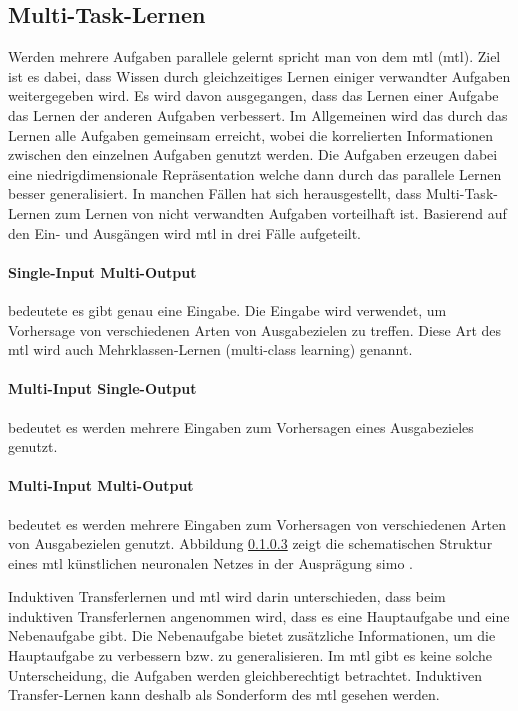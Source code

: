 		\subsection{Multi-Task-Lernen}
		Werden mehrere Aufgaben parallele gelernt spricht man von dem \acl{mtl} (\ac{mtl}). Ziel ist es dabei, dass Wissen durch gleichzeitiges Lernen einiger verwandter Aufgaben weitergegeben wird. Es wird davon ausgegangen, dass das Lernen einer Aufgabe das Lernen der anderen Aufgaben verbessert. Im Allgemeinen wird das durch das Lernen alle Aufgaben gemeinsam erreicht, wobei die korrelierten Informationen zwischen den einzelnen Aufgaben genutzt werden. Die Aufgaben erzeugen dabei eine niedrigdimensionale Repräsentation welche dann durch das parallele Lernen besser generalisiert. In manchen Fällen hat sich herausgestellt, dass Multi-Task-Lernen zum Lernen von nicht verwandten Aufgaben vorteilhaft ist.
		Basierend auf den Ein- und Ausgängen wird \ac{mtl} in drei Fälle aufgeteilt. 
 		
 		\paragraph{Single-Input Multi-Output} bedeutete es gibt genau eine Eingabe. Die Eingabe wird verwendet, um Vorhersage von verschiedenen Arten von Ausgabezielen zu treffen. Diese Art des \ac{mtl} wird auch Mehrklassen-Lernen (multi-class learning) genannt.
		
		\paragraph{Multi-Input Single-Output} bedeutet es werden mehrere Eingaben zum Vorhersagen eines Ausgabezieles genutzt.
	
		\paragraph{Multi-Input Multi-Output} bedeutet es werden mehrere Eingaben zum Vorhersagen von verschiedenen Arten von Ausgabezielen genutzt.
		Abbildung \ref{} zeigt die schematischen Struktur eines \ac{mtl} künstlichen neuronalen Netzes in der Ausprägung \ac{simo} .
		
		Induktiven Transferlernen und \ac{mtl} wird darin unterschieden, dass beim induktiven Transferlernen angenommen wird, dass es eine Hauptaufgabe und eine Nebenaufgabe gibt. Die Nebenaufgabe bietet zusätzliche Informationen, um die Hauptaufgabe zu verbessern bzw. zu generalisieren. Im \ac{mtl} gibt es keine solche Unterscheidung, die Aufgaben werden gleichberechtigt betrachtet. Induktiven Transfer-Lernen kann deshalb als Sonderform des \ac{mtl} gesehen werden. 
		
